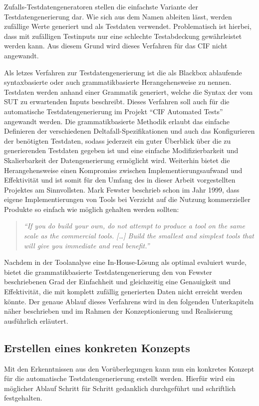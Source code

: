 Zufalls-Testdatengeneratoren stellen die einfachste Variante der Testdatengenerierung dar. Wie sich aus dem Namen ableiten lässt, werden zufällige Werte generiert und als Testdaten verwendet. \cite[S. 32]{nimpa:2016} Problematisch ist hierbei, dass mit zufälligen Testinputs nur eine schlechte Testabdeckung gewährleistet werden kann. \cite[S. 41]{myers:2011} Aus diesem Grund wird dieses Verfahren für das \ac{CIF} nicht angewandt.

Als letzes Verfahren zur Testdatengenerierung ist die als Blackbox ablaufende syntaxbasierte oder auch grammatikbasierte Herangehensweise zu nennen. Testdaten werden anhand einer Grammatik generiert, welche die Syntax der vom \ac{SUT} zu erwartenden Inputs beschreibt. \cite[S. 32]{nimpa:2016} Dieses Verfahren soll auch für die automatische Testdatengenerierung im Projekt \enquote{CIF Automated Tests} angewandt werden. Die grammatikbasierte Methodik erlaubt das einfache Definieren der verschiedenen Deltafall-Spezifikationen und auch das Konfigurieren der benötigten Testdaten, sodass jederzeit ein guter Überblick über die zu generierenden Testdaten gegeben ist und eine einfache Modifizierbarkeit und Skalierbarkeit der Datengenerierung ermöglicht wird. Weiterhin bietet die Herangehensweise einen Kompromiss zwischen Implementierungsaufwand und Effektivität und ist somit für den Umfang des in dieser Arbeit vorgestellten Projektes am Sinnvollsten. Mark Fewster \cite{fewster:1999} beschrieb schon im Jahr 1999, dass eigene Implementierungen von Tools bei Verzicht auf die Nutzung kommerzieller Produkte so einfach wie möglich gehalten werden sollten:

\begin{quote}
    \textit{\enquote{If you do build your own, do not attempt to produce a tool on the same scale as the commercial tools. [\dots] Build the smallest and simplest tools that will give you immediate and real benefit.} \cite{fewster:1999}}
\end{quote}

Nachdem in der Toolanalyse eine In-House-Lösung als optimal evaluiert wurde, bietet die grammatikbasierte Testdatengenerierung den von Fewster beschriebenen Grad der Einfachheit und gleichzeitig eine Genauigkeit und Effektivität, die mit komplett zufällig generierten Daten nicht erreicht werden könnte. Der genaue Ablauf dieses Verfahrens wird in den folgenden Unterkapiteln näher beschrieben und im Rahmen der Konzeptionierung und Realisierung ausführlich erläutert.

\subsection{Erstellen eines konkreten Konzepts}\label{subsec:konzept}
Mit den Erkenntnissen aus den Vorüberlegungen kann nun ein konkretes Konzept für die automatische Testdatengenerierung erstellt werden. Hierfür wird ein möglicher Ablauf Schritt für Schritt gedanklich durchgeführt und schriftlich festgehalten.

